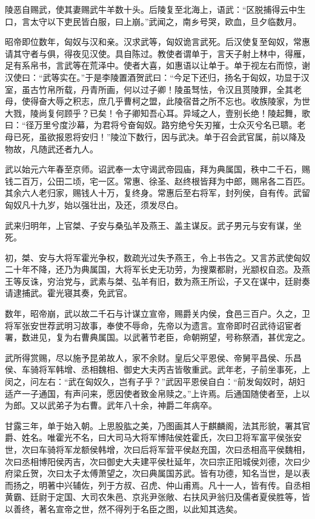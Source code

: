 \documentclass[]{article}
\begin{document}
陵恶自赐武，使其妻赐武牛羊数十头。后陵复至北海上，语武：``区脱捕得云中生口，言太守以下吏民皆白服，曰上崩。''武闻之，南乡号哭，欧血，旦夕临数月。

昭帝即位数年，匈奴与汉和亲。汉求武等，匈奴诡言武死。后汉使复至匈奴，常惠请其守者与俱，得夜见汉使。具自陈过。教使者谓单于，言天子射上林中，得雁，足有系帛书，言武等在荒泽中。使者大喜，如惠语以让单于。单于视左右而惊，谢汉使曰：``武等实在。''于是李陵置酒贺武曰：``今足下还归，扬名于匈奴，功显于汉室，虽古竹帛所载，丹青所画，何以过子卿！陵虽驽怯，令汉且贳陵罪，全其老母，使得奋大辱之积志，庶几乎曹柯之盟，此陵宿昔之所不忘也。收族陵家，为世大戮，陵尚复何顾乎？已矣！令子卿知吾心耳。异域之人，壹别长绝！陵起舞，歌曰：``径万里兮度沙幕，为君将兮奋匈奴。路穷绝兮矢刃摧，士众灭兮名已聩。老母已死，虽欲报恩将安归！''陵泣下数行，因与武决。单于召会武官属，前以降及物故，凡随武还者九人。

武以始元六年春至京师。诏武奉一太守谒武帝园庙，拜为典属国，秩中二千石，赐钱二百万，公田二顷，宅一区。常惠、徐圣、赵终根皆拜为中郎，赐帛各二百匹。其余六人老归家，赐钱人十万，复终身。常惠后至右将军，封列侯，自有传。武留匈奴凡十九岁，始以强壮出，及还，须发尽白。

武来归明年，上官桀、子安与桑弘羊及燕王、盖主谋反。武子男元与安有谋，坐死。

初，桀、安与大将军霍光争权，数疏光过失予燕王，令上书告之。又言苏武使匈奴二十年不降，还乃为典属国，大将军长史无功劳，为搜粟都尉，光颛权自恣。及燕王等反诛，穷治党与，武素与桀、弘羊有旧，数为燕王所讼，子又在谋中，廷尉奏请逮捕武。霍光寝其奏，免武官。

数年，昭帝崩，武以故二千石与计谋立宣帝，赐爵关内侯，食邑三百户。久之，卫将军张安世荐武明习故事，奉使不辱命，先帝以为遗言。宣帝即时召武待诏宦者署，数进见，复为右曹典属国。以武著节老臣，命朝朔望，号称祭酒，甚优宠之。

武所得赏赐，尽以施予昆弟故人，家不余财。皇后父平恩侯、帝舅平昌侯、乐昌侯、车骑将军韩增、丞相魏相、御史大夫丙吉皆敬重武。武年老，子前坐事死，上闵之，问左右：``武在匈奴久，岂有子乎？''武因平恩侯自白：``前发匈奴时，胡妇适产一子通国，有声问来，愿因使者致金帛赎之。''上许焉。后通国随使者至，上以为郎。又以武弟子为右曹。武年八十余，神爵二年病卒。

甘露三年，单于始入朝。上思股肱之美，乃图画其人于麒麟阁，法其形貌，署其官爵、姓名。唯霍光不名，曰大司马大将军博陆侯姓霍氏，次曰卫将军富平侯张安世，次曰车骑将军龙额侯韩增，次曰后将军营平侯赵充国，次曰丞相高平侯魏相，次曰丞相博阳侯丙吉，次曰御史大夫建平侯杜延年，次曰宗正阳城侯刘德，次曰少府梁丘贺，次曰太子太傅萧望之，次曰典属国苏武。皆有功德，知名当世，是以表而扬之，明著中兴辅佐，列于方叔、召虎、仲山甫焉。凡十一人，皆有传。自丞相黄霸、廷尉于定国、大司农朱邑、京兆尹张敞、右扶风尹翁归及儒者夏侯胜等，皆以善终，著名宣帝之世，然不得列于名臣之图，以此知其选矣。
\end{document}
